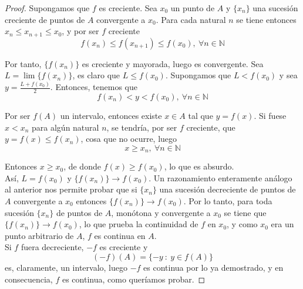 \begin{proof}
    Supongamos que $f$ es creciente. Sea $x_0$ un punto de $A$ y $\{x_n\}$ una sucesión creciente de puntos de $A$ convergente a $x_0$. Para cada natural $n$ se tiene entonces $x_n \leq x_{n+1} \leq x_0$, y por ser $f$ creciente
    \begin{equation*}
        f(x_n) \leq f(x_{n+1}) \leq f(x_0), ~ \forall n \in \mathbb{N}
    \end{equation*}
    
    Por tanto, $\{f(x_n)\}$ es creciente y mayorada, luego es convergente. Sea $L = \lim \{f(x_n)\}$, es claro que $L \leq f(x_0)$. Supongamos que $L < f(x_0)$ y sea $y = \frac{L+f(x_0)}{2}$. Entonces, tenemos que
    \begin{equation*}
        f(x_n) < y < f(x_0), ~ \forall n \in \mathbb{N}
    \end{equation*}
    
    Por ser $f(A)$ un intervalo, entonces existe $x \in A$ tal que $y = f(x)$. Si fuese $x < x_n$ para algún natural $n$, se tendría, por ser $f$ creciente, que $y = f(x) \leq f(x_n)$, cosa que no ocurre, luego
    \begin{equation*}
        x \geq x_n, ~ \forall n \in \mathbb{N}
    \end{equation*}

    Entonces $x \geq x_0$, de donde $f(x) \geq f(x_0)$, lo que es absurdo.\\

    Así, $L = f(x_0)$ y $\{f(x_n)\} \longrightarrow f(x_0)$. Un razonamiento enteramente análogo al anterior nos permite probar que si $\{x_n\}$ una sucesión decreciente de puntos de $A$ convergente a $x_0$ entonces $\{f(x_n)\} \longrightarrow f(x_0)$. Por lo tanto, para toda sucesión $\{x_n\}$ de puntos de $A$, monótona y convergente a $x_0$ se tiene que $\{f(x_n)\} \longrightarrow f(x_0)$, lo que prueba la continuidad de $f$ en $x_0$, y como $x_0$ era un punto arbitrario de $A$, $f$ es continua en $A$.\\
    
    Si $f$ fuera decreciente, $-f$ es creciente y
    \begin{equation*}
        (-f)(A) = \{-y ~:~ y \in f(A)\}
    \end{equation*}
    es, claramente, un intervalo, luego $-f$ es continua por lo ya demostrado, y en consecuencia, $f$ es continua,
    como queríamos probar.
\end{proof}
    
